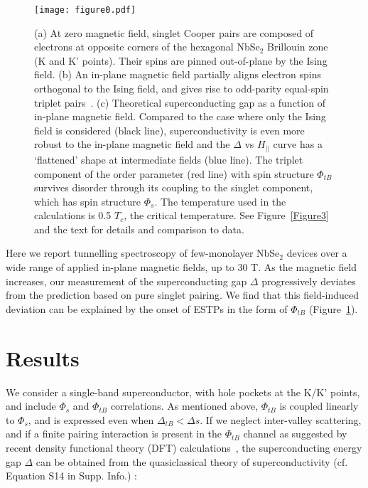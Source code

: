 \documentclass[showpacs,superscriptaddress,preprint,prb]{revtex4}
\begin{document}
\begin{figure}	
	\texttt{[image: figure0.pdf]}	
	\caption{(a) At zero magnetic field, singlet Cooper pairs are composed of electrons at opposite corners of the hexagonal NbSe$_2$ Brillouin zone (K and K' points). Their spins are pinned out-of-plane by the Ising field. (b) An in-plane magnetic field partially aligns electron spins orthogonal to the Ising field, and gives rise to odd-parity equal-spin triplet pairs~\cite{mockli2020}. (c) Theoretical superconducting gap as a function of in-plane magnetic field. Compared to the case where only the Ising field is considered (black line), superconductivity is even more robust to the in-plane magnetic field and the $\Delta$ vs $H_{||}$ curve has a `flattened' shape at intermediate fields (blue line). The triplet component of the order parameter (red line) with spin structure $\Phi_{tB}$  survives disorder through its coupling to the singlet component, which has spin structure $\Phi_{s}$. The temperature used in the calculations is 0.5 $T_c$, the critical temperature.
	See Figure~\ref{Figure3} and the text for details and comparison to data.
	}
	\label{Figure0}
\end{figure}


Here we report tunnelling spectroscopy of few-monolayer NbSe$_2$ devices over a wide range of applied in-plane magnetic fields, up to 30 T. As the magnetic field increases, our measurement of the superconducting gap $\Delta$ progressively deviates from the prediction based on pure singlet pairing. We find that this field-induced deviation can be explained by the onset of ESTPs in the form of $\Phi_{tB}$ (Figure~\ref{Figure0}).




\section{Results}

We consider a single-band superconductor, with hole pockets at the K/K' points, and include $\Phi_s$ and $ \Phi_{tB}$ correlations. As mentioned above, $\Phi_{tB}$ is coupled linearly to $\Phi_{s}$, and is expressed even when $\Delta_{tB}<\Delta{s}$. If we neglect inter-valley scattering, and if a finite pairing interaction is present in the $\Phi_{tB}$ channel as suggested by recent density functional theory (DFT) calculations~\cite{wickramaratne2020}, the superconducting energy gap $\Delta$ can be obtained from the quasiclassical theory of superconductivity (cf. Equation S14 in Supp. Info.) :
\end{document}
